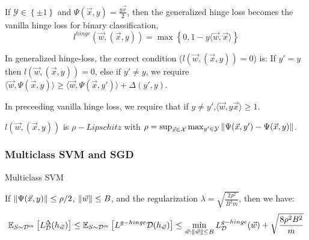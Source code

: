 If $ \mathcal{Y} \in \left\{ \pm 1 \right\} $ and $ \Psi(\vec{x}, y) = \frac{y \vec{x}}{2}  $, then the generalized hinge loss becomes the vanilla hinge loss for binary classification,
\[
    l^{hinge}(\vec{w}, (\vec{x}, y)) = \max\left\{ 0, 1-y\langle \vec{w}, \vec{x} \rangle \right\}
\]

In generalized hinge-loss, the correct condition ($ l(\vec{w}, (\vec{x}, y)) = 0 $) is: If $ y' = y $ then $ l(\vec{w}, (\vec{x}, y)) = 0$, else if $ y' \ne y $, we require $ \langle \vec{w}, \Psi(\vec{x}, y) \rangle \ge \langle \vec{w}, \Psi(\vec{x}, y') \rangle + \Delta(y', y) $.

In preceeding vanilla hinge loss, we require that if $ y \ne y' $,$ \langle \vec{w}, y \vec{x} \rangle \ge 1 $.

$ l(\vec{w}, (\vec{x}, y)) $ is $ \rho-Lipschitz $ with $ \rho = \sup_{\vec{x} \in \mathcal{X}}\max_{y' \in \mathcal{Y}} \Arrowvert \Psi(\vec{x}, y') - \Psi(\vec{x}, y) \Arrowvert $.

\subsubsection{Multiclass SVM and SGD}%

\begin{algorithm}[H]
    \caption{Multiclass SVM}
    \begin{algorithmic}
    \end{algorithmic}
\end{algorithm}

\begin{corollary}
    If $ \Arrowvert \Psi(\vec{x}, y) \Arrowvert \le \rho/2 $, $ \Arrowvert \vec{w} \Arrowvert \le B $, and the regularization $ \lambda = \sqrt{ \frac{2\rho^2}{B^2 m} } $, then we have:
    \[
        \mathbb{E}_{S\sim \mathcal{D}^m} \left[ L^\Delta_{\mathcal{D}}(h_{\vec{w}}) \right] \le \mathbb{E}_{S\sim \mathcal{D}^m} \left[ L^{g-hinge}{\mathcal{D}}(h_{\vec{w}}) \right] \le \min_{\vec{w}: \Arrowvert \vec{w} \Arrowvert \le B} L^{g-hinge}_{\mathcal{D}}(\vec{w}) + \sqrt{ \frac{8\rho^2 B^2}{m} }
    \]
\end{corollary}

